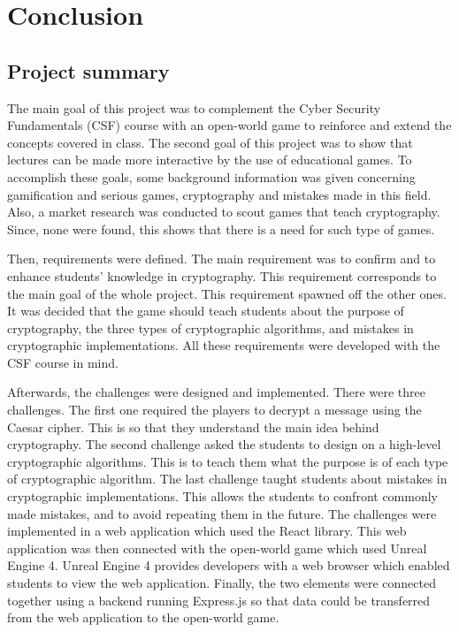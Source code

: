 \documentclass{l4proj}
\begin{document}
\chapter{Conclusion}

\section{Project summary}

The main goal of this project was to complement the 
Cyber Security Fundamentals (CSF) course with an open-world game to reinforce
and extend the concepts covered in class.
The second goal of this project was to show that lectures can be made more interactive
by the use of educational games.
To accomplish these goals, some background information was given concerning gamification and serious games, 
cryptography and mistakes made in this field. Also, a market research was conducted to scout games 
that teach cryptography. Since, none were found, this shows that there is a need for such type of games.

Then, requirements were defined. 
The main requirement was to confirm and to enhance students' knowledge in cryptography. 
This requirement corresponds to the main goal of the whole project. 
This requirement spawned off the other ones. 
It was decided that the game should teach students about the purpose of cryptography,
the three types of cryptographic algorithms, and mistakes in cryptographic implementations.
All these requirements were developed with the CSF course in mind.

Afterwards, the challenges were designed and implemented.
There were three challenges. 
The first one required the players to decrypt a message using the Caesar cipher.
This is so that they understand the main idea behind cryptography.
The second challenge asked the students to design on a high-level cryptographic algorithms.
This is to teach them what the purpose is of each type of cryptographic algorithm.
The last challenge taught students about mistakes in cryptographic implementations.
This allows the students to confront commonly made mistakes, and to avoid repeating them in the future.
The challenges were implemented in a web application which used the React library.
This web application was then connected with the open-world game which used Unreal Engine 4.
Unreal Engine 4 provides developers with a web browser which enabled students to view the web application.
Finally, the two elements were connected together using a backend running Express.js so that data could be transferred
from the web application to the open-world game.
\end{document}
